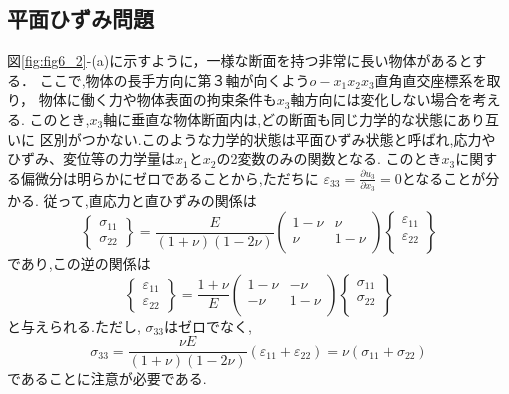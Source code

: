 \documentclass[10pt,a4j]{jarticle}
\begin{document}
\subsection{平面ひずみ問題}
図\ref{fig:fig6_2}-(a)に示すように，一様な断面を持つ非常に長い物体があるとする．
ここで,物体の長手方向に第３軸が向くよう$o-x_1x_2x_3$直角直交座標系を取り，
物体に働く力や物体表面の拘束条件も$x_3$軸方向には変化しない場合を考える.
このとき,$x_3$軸に垂直な物体断面内は,どの断面も同じ力学的な状態にあり互いに
区別がつかない.このような力学的状態は平面ひずみ状態と呼ばれ,応力や
ひずみ、変位等の力学量は$x_1$と$x_2$の2変数のみの関数となる.
このとき$x_3$に関する偏微分は明らかにゼロであることから,ただちに
$\varepsilon_{33}=\frac{\partial u_3}{\partial x_3}=0$となることが分かる.
従って,直応力と直ひずみの関係は
\begin{equation}
	\left\{ 
	\begin{array}{*{20}{c}}
		\sigma _{11}\\
		\sigma _{22}
	\end{array} 
	\right\} 
	= 
	\frac{E}{\left( 1 + \nu  \right)\left( 1 - 2\nu  \right)}
	\left( 
		\begin{array}{*{20}{c}}
		1 - \nu & \nu \\
		\nu & 1 - \nu \\
		\end{array}
	\right)
	\left\{ 
		\begin{array}{*{20}{c}}
		\varepsilon _{11}\\
		\varepsilon _{22}\\
		\end{array}
	\right\}
	\label{eqn:Hooke_pstrain}
\end{equation}
であり,この逆の関係は
\begin{equation}
	\left\{ 
	\begin{array}{*{20}{c}}
		\varepsilon _{11}\\
		\varepsilon_{22}
	\end{array} 
	\right\} 
	= 
	\frac{1+\nu}{E}
	\left( 
		\begin{array}{*{20}{c}}
		1 - \nu & -\nu \\
		-\nu & 1 - \nu \\
		\end{array}
	\right)
	\left\{ 
		\begin{array}{*{20}{c}}
		\sigma_{11}\\
		\sigma_{22}\\
		\end{array}
	\right\}
	\label{eqn:Hooke_pstrain}
\end{equation}
と与えられる.ただし, $\sigma_{33}$はゼロでなく,
\begin{equation}
	\sigma_{33}
	=\frac{\nu E}{(1+\nu)(1-2\nu)}\left(\varepsilon_{11}+\varepsilon_{22}\right)
	=\nu \left(\sigma_{11}+\sigma_{22}\right)
	\label{eqn:s33_pstrain}
\end{equation}
であることに注意が必要である.
\end{document}
